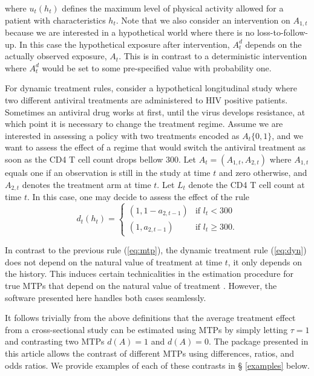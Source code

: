\documentclass[]{jss}
\begin{document}
where \(u_t(h_t)\) defines the maximum level of
physical activity allowed for a patient with characteristics
$h_t$. Note that we also consider an intervention on $A_{1,t}$ because
we are interested in a hypothetical world where there is no
loss-to-follow-up. In this case the hypothetical exposure after
intervention, \(A^{d}_t\) depends on the actually observed exposure,
\(A_t\). This is in contrast to a deterministic intervention where
\(A^{d}_t\) would be set to some pre-specified value with probability
one.


For dynamic treatment rules, consider a hypothetical longitudinal
study where two different antiviral treatments are administered to HIV
positive patients. Sometimes an antiviral drug works at first, until
the virus develops resistance, at which point it is necessary to
change the treatment regime. Assume we are interested in assessing a
policy with two treatments encoded as $A_t\{0,1\}$, and we want to
assess the effect of a regime that would switch the antiviral
treatment as soon as the CD4 T cell count drops bellow 300. Let
\(A_t = (A_{1, t}, A_{2, t})\) where \(A_{1, t}\) equals one if an
observation is still in the study at time \(t\) and zero otherwise,
and \(A_{2, t}\) denotes the treatment arm at time $t$. Let $L_t$
denote the CD4 T cell count at time $t$. In this case, one may decide
to assess the effect of the rule
\begin{equation}\label{eq:dyn}
  d_t(h_t)=
  \begin{cases}
    (1, 1 - a_{2,t-1}) & \text{if } l_t < 300  \\
    (1, a_{2,t-1}) & \text{if } l_t  \geq 300.
  \end{cases}
\end{equation}

In contrast to the previous rule (\ref{eq:mtp}), the dynamic treatment
rule (\ref{eq:dyn}) does not depend on the natural value of treatment
at time $t$, it only depends on the history. This induces certain
technicalities in the estimation procedure for true MTPs that depend
on the natural value of treatment
\citep{diazNonparametricCausalEffects2020a}. However, the software
presented here handles both cases seamlessly.

It follows trivially from the above definitions that the average
treatment effect from a cross-sectional study can be estimated using
MTPs by simply letting $\tau = 1$ and contrasting two MTPs $d(A)=1$
and $d(A)=0$. The  package presented in this article allows
the contrast of different MTPs using differences, ratios, and odds
ratios. We provide examples of each of these contrasts in \S
\ref{examples} below.
\end{document}
